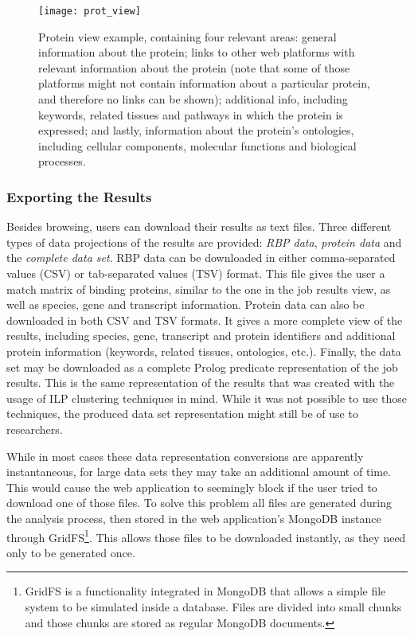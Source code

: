 \begin{figure}[!htb]
  \begin{center}
    \leavevmode
    \texttt{[image: prot\_view]}
    \caption[Protein view example]{
      Protein view example, containing four relevant areas: general information
      about the protein; links to other web platforms with relevant information
      about the protein (note that some of those platforms might not contain
      information about a particular protein, and therefore no links can be
      shown); additional info, including keywords, related tissues and pathways
      in which the protein is expressed; and lastly, information about the
      protein's ontologies, including cellular components, molecular functions
      and biological processes.
    }
    \label{fig:prot_view}
  \end{center}
\end{figure}

\subsubsection*{Exporting the Results}

Besides browsing, users can download their results as text files. Three
different types of data projections of the results are provided: \emph{RBP
data}, \emph{protein data} and the \emph{complete data set}. RBP data can be
downloaded in either comma-separated values (CSV) or tab-separated values (TSV)
format. This file gives the user a match matrix of binding proteins, similar to
the one in the job results view, as well as species, gene and transcript
information. Protein data can also be downloaded in both CSV and TSV formats. It
gives a more complete view of the results, including species, gene, transcript
and protein identifiers and additional protein information (keywords, related
tissues, ontologies, etc.). Finally, the data set may be downloaded as a
complete Prolog predicate representation of the job results. This is the same
representation of the results that was created with the usage of ILP clustering
techniques in mind. While it was not possible to use those techniques, the
produced data set representation might still be of use to researchers.

While in most cases these data representation conversions are apparently
instantaneous, for large data sets they may take an additional amount of time.
This would cause the web application to seemingly block if the user tried to
download one of those files. To solve this problem all files are generated
during the analysis process, then stored in the web application's MongoDB
instance through GridFS\footnote{GridFS is a functionality integrated in MongoDB
that allows a simple file system to be simulated inside a database. Files are
divided into small chunks and those chunks are stored as regular MongoDB
documents.}. This allows those files to be downloaded instantly, as they need
only to be generated once.

